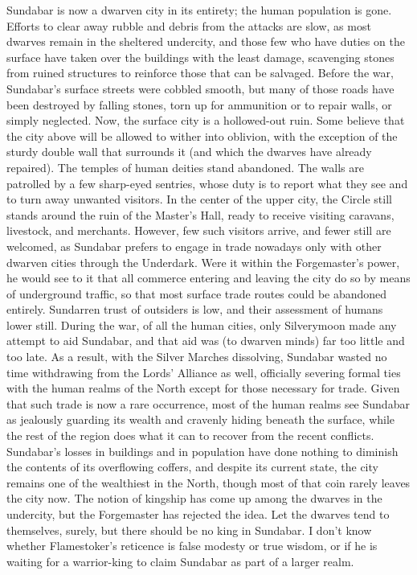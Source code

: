 \documentclass[10pt,a4paper,twoside,twocolumn,openany,bg=print,nodeprecatedcode]{dndbook}
\begin{document}
Sundabar is now a dwarven city in its entirety; the human population is gone. Efforts to clear away rubble and debris from the attacks are slow, as most dwarves remain in the sheltered undercity, and those few who have duties on the surface have taken over the buildings with the least damage, scavenging stones from ruined structures to reinforce those that can be salvaged.
Before the war, Sundabar's surface streets were cobbled smooth, but many of those roads have been destroyed by falling stones, torn up for ammunition or to repair walls, or simply neglected. Now, the surface city is a hollowed-out ruin. Some believe that the city above will be allowed to wither into oblivion, with the exception of the sturdy double wall that surrounds it (and which the dwarves have already repaired). The temples of human deities stand abandoned. The walls are patrolled by a few sharp-eyed sentries, whose duty is to report what they see and to turn away unwanted visitors.
In the center of the upper city, the Circle still stands around the ruin of the Master's Hall, ready to receive visiting caravans, livestock, and merchants. However, few such visitors arrive, and fewer still are welcomed, as Sundabar prefers to engage in trade nowadays only with other dwarven cities through the Underdark. Were it within the Forgemaster's power, he would see to it that all commerce entering and leaving the city do so by means of underground traffic, so that most surface trade routes could be abandoned entirely.
Sundarren trust of outsiders is low, and their assessment of humans lower still. During the war, of all the human cities, only Silverymoon made any attempt to aid Sundabar, and that aid was (to dwarven minds) far too little and too late. As a result, with the Silver Marches dissolving, Sundabar wasted no time withdrawing from the Lords' Alliance as well, officially severing formal ties with the human realms of the North except for those necessary for trade. Given that such trade is now a rare occurrence, most of the human realms see Sundabar as jealously guarding its wealth and cravenly hiding beneath the surface, while the rest of the region does what it can to recover from the recent conflicts. Sundabar's losses in buildings and in population have done nothing to diminish the contents of its overflowing coffers, and despite its current state, the city remains one of the wealthiest in the North, though most of that coin rarely leaves the city now.
The notion of kingship has come up among the dwarves in the undercity, but the Forgemaster has rejected the idea. Let the dwarves tend to themselves, surely, but there should be no king in Sundabar. I don't know whether Flamestoker's reticence is false modesty or true wisdom, or if he is waiting for a warrior-king to claim Sundabar as part of a larger realm.
\end{document}
